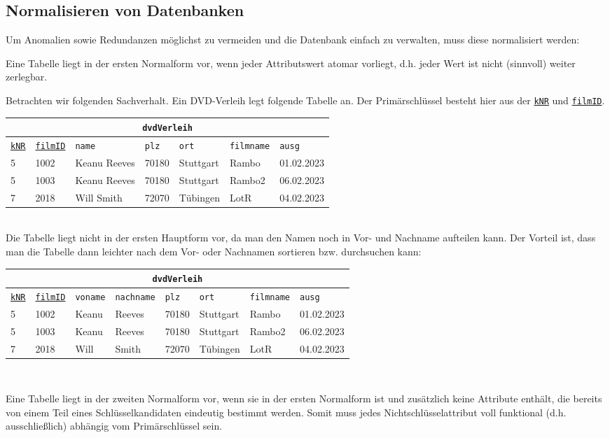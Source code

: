 \subsection[Normalisieren]{Normalisieren von Datenbanken}
Um Anomalien sowie Redundanzen möglichst zu vermeiden und die Datenbank einfach zu verwalten, muss diese normalisiert werden:
\begin{tcolorbox}[title=Erste Normalform]
	Eine Tabelle liegt in der ersten Normalform vor, wenn jeder Attributswert atomar vorliegt, d.h. jeder Wert ist nicht (sinnvoll) weiter zerlegbar.
\end{tcolorbox}
Betrachten wir folgenden Sachverhalt. Ein DVD-Verleih legt folgende Tabelle an. Der Primärschlüssel besteht hier aus der \underline{\lstinline!kNR!} und \underline{\lstinline!filmID!}.
\begin{tabular}{lllllll}
	\multicolumn{7}{c}{\lstinline!dvdVerleih!}\\
	\hline
	\underline{\lstinline!kNR!}&\underline{\lstinline!filmID!}&\lstinline!name!&\lstinline!plz!&\lstinline!ort!&\lstinline!filmname!&\lstinline!ausg!\\
	\hline
	5&1002&Keanu Reeves&70180&Stuttgart&Rambo&01.02.2023\\
	5&1003&Keanu Reeves&70180&Stuttgart&Rambo2&06.02.2023\\
	7&2018&Will Smith&72070&Tübingen&LotR&04.02.2023\\
\end{tabular}\\
Die Tabelle liegt nicht in der ersten Hauptform vor, da man den Namen noch in Vor- und Nachname aufteilen kann. Der Vorteil ist, dass man die Tabelle dann leichter nach dem Vor- oder Nachnamen sortieren bzw. durchsuchen kann:
\begin{tabular}{llllllll}
	\multicolumn{8}{c}{\lstinline!dvdVerleih!}\\
	\hline
	\underline{\lstinline!kNR!}&\underline{\lstinline!filmID!}&\lstinline!voname!&\lstinline!nachname!&\lstinline!plz!&\lstinline!ort!&\lstinline!filmname!&\lstinline!ausg!\\
	\hline
	5&1002&Keanu&Reeves&70180&Stuttgart&Rambo&01.02.2023\\
	5&1003&Keanu&Reeves&70180&Stuttgart&Rambo2&06.02.2023\\
	7&2018&Will&Smith&72070&Tübingen&LotR&04.02.2023\\
\end{tabular}\\
\begin{tcolorbox}[title=Zweite Normalform]
	Eine Tabelle liegt in der zweiten Normalform vor, wenn sie in der ersten Normalform ist und zusätzlich keine Attribute enthält, die bereits von einem Teil eines Schlüsselkandidaten eindeutig bestimmt werden. Somit muss jedes Nichtschlüsselattribut voll funktional (d.h. ausschließlich) abhängig vom Primärschlüssel sein.
\end{tcolorbox}
